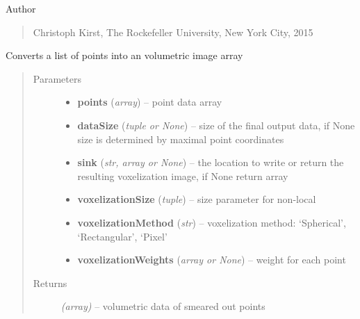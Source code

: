 \documentclass[letterpaper,10pt,english]{sphinxmanual}
\begin{document}
Author
\begin{quote}

Christoph Kirst, The Rockefeller University, New York City, 2015
\end{quote}

\begin{fulllineitems}
\label{api/ClearMap.Analysis:ClearMap.Analysis.Voxelization.voxelize}
Converts a list of points into an volumetric image array
\begin{quote}\begin{description}
\item[{Parameters}] \leavevmode\begin{itemize}
\item {} 
\textbf{points} (\emph{array}) --
point data array

\item {} 
\textbf{dataSize} (\emph{tuple or None}) --
size of the final output data, if None size is determined by maximal point coordinates

\item {} 
\textbf{sink} (\emph{str, array or None}) --
the location to write or return the resulting voxelization image, if None return array

\item {} 
\textbf{voxelizationSize} (\emph{tuple}) --
size parameter for non-local

\item {} 
\textbf{voxelizationMethod} (\emph{str}) --
voxelization method: `Spherical', `Rectangular', `Pixel'

\item {} 
\textbf{voxelizationWeights} (\emph{array or None}) --
weight for each point

\end{itemize}

\item[{Returns}] \leavevmode
\emph{(array)} --
volumetric data of smeared out points

\end{description}\end{quote}

\end{fulllineitems}
\end{document}
